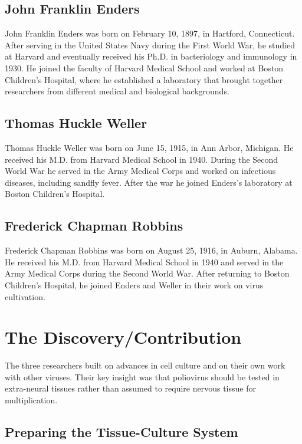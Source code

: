\subsection{John Franklin Enders}

John Franklin Enders was born on February 10, 1897, in Hartford, Connecticut. After serving in the United States Navy during the First World War, he studied at Harvard and eventually received his Ph.D. in bacteriology and immunology in 1930. He joined the faculty of Harvard Medical School and worked at Boston Children's Hospital, where he established a laboratory that brought together researchers from different medical and biological backgrounds.

\subsection{Thomas Huckle Weller}

Thomas Huckle Weller was born on June 15, 1915, in Ann Arbor, Michigan. He received his M.D. from Harvard Medical School in 1940. During the Second World War he served in the Army Medical Corps and worked on infectious diseases, including sandfly fever. After the war he joined Enders's laboratory at Boston Children's Hospital.

\subsection{Frederick Chapman Robbins}

Frederick Chapman Robbins was born on August 25, 1916, in Auburn, Alabama. He received his M.D. from Harvard Medical School in 1940 and served in the Army Medical Corps during the Second World War. After returning to Boston Children's Hospital, he joined Enders and Weller in their work on virus cultivation.

\section{The Discovery/Contribution}

The three researchers built on advances in cell culture and on their own work with other viruses. Their key insight was that poliovirus should be tested in extra-neural tissues rather than assumed to require nervous tissue for multiplication.

\subsection{Preparing the Tissue-Culture System}

